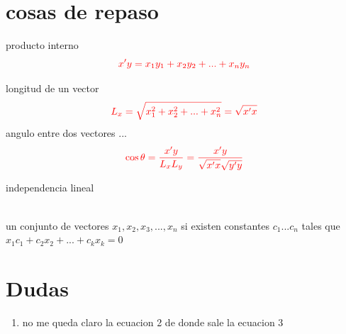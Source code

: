 \documentclass[10pt,a4paper]{article} %
\begin{document}
    \section{cosas de repaso}
        producto interno
        \begin{equation}
             \color{red} x'y=x_1 y_1 + x_2 y_2 + ... + x_n y_n
             \color{white}
         \end{equation}

         longitud de un vector
         \begin{equation}
            \color{red}  L_x = \sqrt{x_1 ^{2} + x_2 ^{2} + ... + x_n ^{2}   } = \sqrt{x'x}
 \color{white}          \end{equation}
     angulo entre dos vectores ...
        \begin{equation}
            \color{red} \cos{\theta }  = \frac{x'y }{L_x L_y} = \frac{x'y}{\sqrt{x'x}
            \sqrt{y'y}  } \color{white}
        \end{equation}

    independencia lineal

    \\ un conjunto de vectores $ x_1 , x_2 , x_3 , ... , x_ n  $ si existen
    constantes $ c_1 ... c_n  $  tales que \color{red} $ x_1 c_1 + c_2 x_2 +
    ... + c_{k}x_k
    = 0    $ \color{white}
    \\
    \section{Dudas}
        \begin{enumerate}
            \item {\color{green} no me queda claro la ecuacion 2 de donde sale
                la ecuacion 3 \color{white}  }
        \end{enumerate}












    \nocite{*}
    
    
\end{document}
